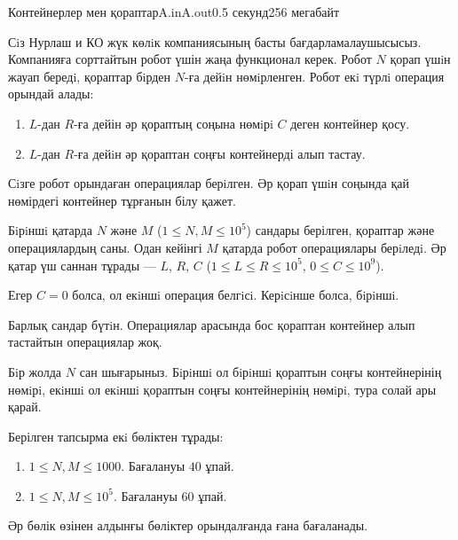 \begin{problem}{Контейнерлер мен қораптар}{A.in}{A.out}{0.5 секунд}{256 мегабайт}

Сiз Нурлаш и КО жүк көлiк компаниясының басты бағдарламалаушысысыз. Компанияға сорттайтын робот үшін жаңа функционал керек. Робот $N$ қорап үшiн жауап бередi, қораптар бiрден $N$-ға дейiн нөмiрленген. Робот екi түрлi операция орындай алады:

\begin{enumerate}
    \item $L$-дан $R$-ға дейін әр қораптың соңына нөмiрi $C$ деген контейнер қосу.
    \item $L$-дан $R$-ға дейiн әр қораптан соңғы контейнерді алып тастау.
\end{enumerate}

Сiзге робот орындаған операциялар берiлген. Әр қорап үшiн соңында қай нөмірдегі контейнер тұрғанын білу қажет.

\InputFile
Бiрiншi қатарда $N$ және $M$ ($1 \leq N, M \leq 10^5$) сандары берілген, қораптар және операциялардың саны. Одан кейінгі $M$ қатарда робот операциялары берiледi. Әр қатар үш саннан тұрады --- $L$, $R$, $C$ ($1 \leq L \leq R \leq 10^5$, $0 \leq C \leq 10^9$).

Егер $C = 0$ болса, ол екiншi операция белгiсi. Керiсiнше болса, бiрiншi.

Барлық сандар бүтiн. Операциялар арасында бос қораптан контейнер алып тастайтын операциялар жоқ.

 

\OutputFile
Бiр жолда $N$ сан шығарыныз. Бiрiншi ол бiрiншi қораптын соңғы контейнерінің нөмiрi, екiншi ол екiншi қораптын соңғы контейнерінің нөмiрi, тура солай ары қарай.

\Examples

\begin{example}
%
\end{example}


\Scoring
Берілген тапсырма екi бөліктен тұрады:
\begin{enumerate}
\item $1 \leq N, M \leq 1000$. Бағалануы $40$ ұпай.
\item $1 \leq N, M \leq 10^5$. Бағалануы $60$ ұпай.
\end{enumerate}

Әр бөлік өзінен алдынғы бөліктер орындалғанда ғана бағаланады.

\end{problem}
